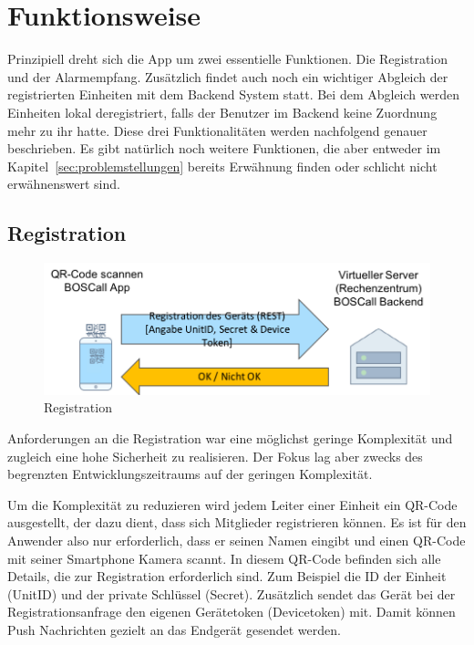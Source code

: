 \section{Funktionsweise}
\label{sec:funktionsweise}
Prinzipiell dreht sich die App um zwei essentielle Funktionen. Die Registration und der Alarmempfang. Zusätzlich findet auch noch ein wichtiger Abgleich der registrierten Einheiten mit dem Backend System statt. Bei dem Abgleich werden Einheiten lokal deregistriert, falls der Benutzer im Backend keine Zuordnung mehr zu ihr hatte. Diese drei Funktionalitäten werden nachfolgend genauer beschrieben. Es gibt natürlich noch weitere Funktionen, die aber entweder im Kapitel~\ref{sec:problemstellungen} bereits Erwähnung finden oder schlicht nicht erwähnenswert sind.
\subsection{Registration}
\begin{figure}[htbp]
	\centering
	\includegraphics[width=\linewidth]{include/img/registration}
	\caption{Registration}
	\label{fig:registration}
\end{figure}
Anforderungen an die Registration war eine möglichst geringe Komplexität und zugleich eine hohe Sicherheit zu realisieren. Der Fokus lag aber zwecks des begrenzten Entwicklungszeitraums auf der geringen Komplexität.

Um die Komplexität zu reduzieren wird jedem Leiter einer Einheit ein QR-Code ausgestellt, der dazu dient, dass sich Mitglieder registrieren können. Es ist für den Anwender also nur erforderlich, dass er seinen Namen eingibt und einen QR-Code mit seiner Smartphone Kamera scannt. In diesem QR-Code befinden sich alle Details, die zur Registration erforderlich sind. Zum Beispiel die ID der Einheit (UnitID) und der private Schlüssel (Secret). Zusätzlich sendet das Gerät bei der Registrationsanfrage den eigenen Gerätetoken (Devicetoken) mit. Damit können Push Nachrichten gezielt an das Endgerät gesendet werden.

